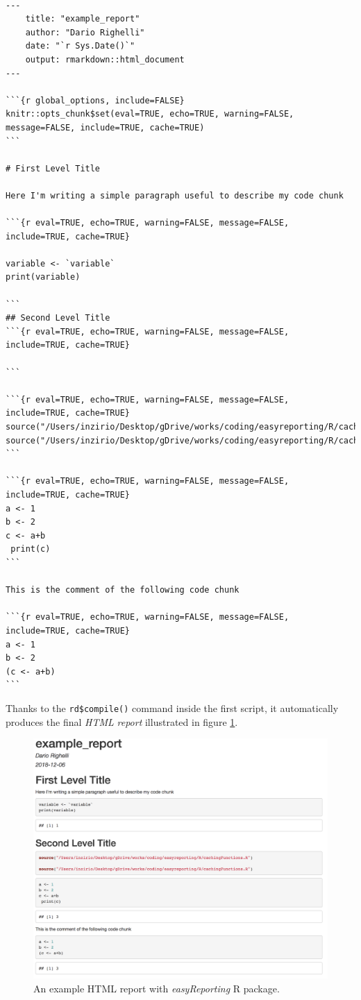 \begin{lstlisting}

---
    title: "example_report"
    author: "Dario Righelli"
    date: "`r Sys.Date()`"
    output: rmarkdown::html_document
---

```{r global_options, include=FALSE}
knitr::opts_chunk$set(eval=TRUE, echo=TRUE, warning=FALSE, message=FALSE, include=TRUE, cache=TRUE)
```

# First Level Title

Here I'm writing a simple paragraph useful to describe my code chunk

```{r eval=TRUE, echo=TRUE, warning=FALSE, message=FALSE, include=TRUE, cache=TRUE}

variable <- `variable`
print(variable)

```
## Second Level Title
```{r eval=TRUE, echo=TRUE, warning=FALSE, message=FALSE, include=TRUE, cache=TRUE}

```

```{r eval=TRUE, echo=TRUE, warning=FALSE, message=FALSE, include=TRUE, cache=TRUE}
source("/Users/inzirio/Desktop/gDrive/works/coding/easyreporting/R/cachingFunctions.R")
source("/Users/inzirio/Desktop/gDrive/works/coding/easyreporting/R/cachingFunctions.R")
```

```{r eval=TRUE, echo=TRUE, warning=FALSE, message=FALSE, include=TRUE, cache=TRUE}
a <- 1
b <- 2
c <- a+b
 print(c)
```

This is the comment of the following code chunk

```{r eval=TRUE, echo=TRUE, warning=FALSE, message=FALSE, include=TRUE, cache=TRUE}
a <- 1
b <- 2
(c <- a+b)
```
\end{lstlisting}

Thanks to the \lstinline!rd$compile()! command inside the first script, it automatically produces the final \textit{HTML} \textit{report} illustrated in figure \ref{fig:rrreport}.

\begin{figure}[H]
\includegraphics[width=\textwidth, keepaspectratio]{img/rr/report.png}
\caption[html report]{An example HTML report with \textit{easyReporting} R package.}
\label{fig:rrreport}
\centering
\end{figure}
